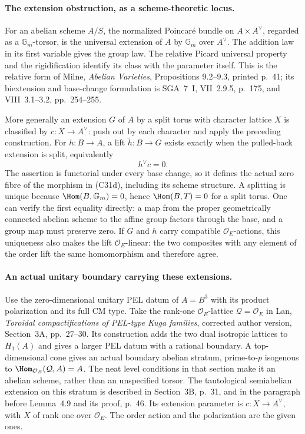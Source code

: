 \documentclass[11pt]{article}
\theoremstyle{definition}\newtheorem{definition}[theorem]{Definition}\newtheorem{remark}[theorem]{Remark}
\begin{document}
\paragraph{The extension obstruction, as a scheme-theoretic locus.}
For an abelian scheme $A/S$, the normalized Poincar\'e bundle
on $A\times A^\vee$, regarded as a $\mathbb G_m$-torsor,
is the universal extension of $A$ by $\mathbb G_m$ over
$A^\vee$. The addition law in its first variable gives the
group law. The relative Picard universal property and the
rigidification identify its class with the parameter itself.
This is the relative form of Milne, \emph{Abelian Varieties},
Propositions 9.2--9.3, printed p.~41; its biextension and
base-change formulation is SGA~7~I, VII~2.9.5, p.~175,
and VIII~3.1--3.2, pp.~254--255.

More generally an extension $G$ of $A$ by a split torus with
character lattice $X$ is classified by
$c:X\to A^\vee$: push out by each character and apply the
preceding construction. For $h:B\to A$, a lift
$\widetilde h:B\to G$ exists exactly when the pulled-back
extension is split, equivalently
\[
                        h^\vee c=0.                 \tag{C31d}
\]
The assertion is functorial under every base change, so it
defines the actual zero fibre of the morphism in (C31d),
including its scheme structure. A splitting is unique because
$\Hom(B,\mathbb G_m)=0$, hence $\Hom(B,T)=0$ for a split
torus. One can verify the first equality directly: a map
from the proper geometrically connected abelian scheme to
the affine group factors through the base, and a group map
must preserve zero. If $G$ and $h$ carry compatible
$\mathcal O_E$-actions, this uniqueness also makes the lift
$\mathcal O_E$-linear: the two composites with any element
of the order lift the same homomorphism and therefore agree.

\paragraph{An actual unitary boundary carrying these extensions.}
Use the zero-dimensional unitary PEL datum of $A=B^3$ with
its product polarization and its full CM type. Take the
rank-one $\mathcal O_E$-lattice $\mathcal Q=\mathcal O_E$
in Lan, \emph{Toroidal compactifications of PEL-type Kuga
families}, corrected author version, Section~3A,
pp.~27--30. Its construction adds the two dual isotropic
lattices to $H_1(A)$ and gives a larger PEL datum with a
rational boundary. A top-dimensional cone gives an actual
boundary abelian stratum, prime-to-$p$ isogenous to
$\Hom_{\mathcal O_E}(\mathcal Q,A)=A$. The neat level
conditions in that section make it an abelian scheme,
rather than an unspecified torsor. The tautological
semiabelian extension on this stratum is described in
Section~3B, p.~31, and in the paragraph before Lemma~4.9
and its proof, p.~46. Its extension parameter is
$c:X\to A^\vee$, with $X$ of rank one over $\mathcal O_E$.
The order action and the polarization are the given ones.
\end{document}
